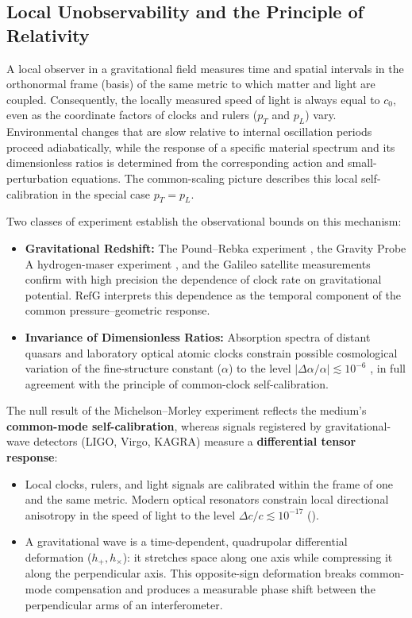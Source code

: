 \documentclass[11pt,a4paper]{article}
\newcommand{\RefG}{\mathrm{RefG}}
\begin{document}
\subsection{Local Unobservability and the Principle of Relativity}

A local observer in a gravitational field measures time and spatial intervals in the orthonormal frame (basis) of the same metric to which matter and light are coupled. Consequently, the locally measured speed of light is always equal to $c_0$, even as the coordinate factors of clocks and rulers ($p_T$ and $p_L$) vary. Environmental changes that are slow relative to internal oscillation periods proceed adiabatically, while the response of a specific material spectrum and its dimensionless ratios is determined from the corresponding action and small-perturbation equations. The common-scaling picture describes this local self-calibration in the special case $p_T=p_L$.

Two classes of experiment establish the observational bounds on this mechanism:
\begin{itemize}
\item \textbf{Gravitational Redshift:} The Pound--Rebka experiment \citep{pound1960}, the Gravity Probe A hydrogen-maser experiment \citep{vessot1980}, and the Galileo satellite measurements \citep{delva2018,herrmann2018} confirm with high precision the dependence of clock rate on gravitational potential. $\RefG$ interprets this dependence as the temporal component of the common pressure--geometric response.
\item \textbf{Invariance of Dimensionless Ratios:} Absorption spectra of distant quasars and laboratory optical atomic clocks constrain possible cosmological variation of the fine-structure constant ($\alpha$) to the level $|\Delta\alpha/\alpha| \lesssim 10^{-6}$ \citep{kotus2017}, in full agreement with the principle of common-clock self-calibration.
\end{itemize}

The null result of the Michelson--Morley experiment reflects the medium's \textbf{common-mode self-calibration}, whereas signals registered by gravitational-wave detectors (LIGO, Virgo, KAGRA) measure a \textbf{differential tensor response}:
\begin{itemize}
\item Local clocks, rulers, and light signals are calibrated within the frame of one and the same metric. Modern optical resonators constrain local directional anisotropy in the speed of light to the level $\Delta c/c \lesssim 10^{-17}$ (\citealt{herrmann2009}).
\item A gravitational wave is a time-dependent, quadrupolar differential deformation ($h_+, h_\times$): it stretches space along one axis while compressing it along the perpendicular axis. This opposite-sign deformation breaks common-mode compensation and produces a measurable phase shift between the perpendicular arms of an interferometer.
\end{itemize}
\end{document}
